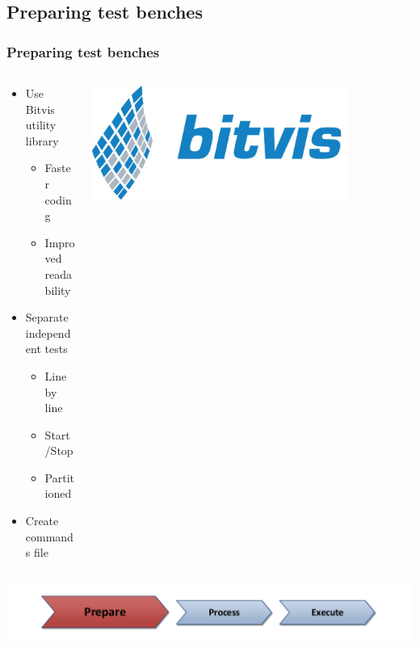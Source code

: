 \documentclass[british,10pt]{beamer}
\begin{document}
\subsection{Preparing test benches}
\begin{frame}\frametitle{Preparing test benches}
\vskip50pt
\begin{columns}
\begin{column}{0.6\textwidth}
\begin{itemize}
\item Use Bitvis utility library
\begin{itemize}
\item Faster coding
\item Improved readability
\end{itemize}
\item Separate independent tests
\begin{itemize}
\item Line by line
\item Start/Stop
\item Partitioned
\end{itemize}
\item Create commands file
\end{itemize}
\end{column}
\includegraphics[width=0.8\textwidth]{images/bitvis.png}
\end{columns}
\centering
\vskip50pt
\includegraphics[width=.7\textwidth]{images/ppe1.pdf}
\end{frame}
\end{document}
